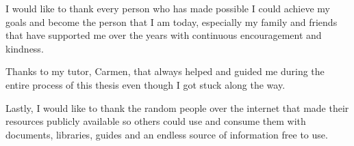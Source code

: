I would like to thank every person who has made possible I could achieve my goals and become the person that I am today, especially my family and friends that have supported me over the years with continuous encouragement and kindness.

Thanks to my tutor, Carmen, that always helped and guided me during the entire process of this thesis even though I got stuck along the way.

Lastly, I would like to thank the random people over the internet that made their resources publicly available so others could use and consume them with documents, libraries, guides and an endless source of information free to use.